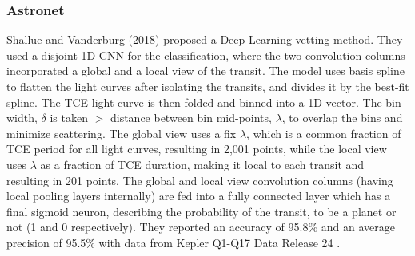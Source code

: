 \subsubsection{Astronet}
Shallue and Vanderburg (2018) \cite{astronet} proposed a Deep Learning vetting method. They used a disjoint 1D CNN for the classification, where the two convolution columns incorporated a global and a local view of the transit. The model uses basis spline to flatten the light curves after isolating the transits, and divides it by the best-fit spline. The TCE light curve is then folded and binned into a 1D vector. The bin width, $\delta$ is taken $>$ distance between bin mid-points, $\lambda$, to overlap the bins and minimize scattering. The global view uses a fix $\lambda$, which is a common fraction of TCE period for all light curves, resulting in 2,001 points, while the local view uses $\lambda$ as a fraction of TCE duration, making it local to each transit and resulting in 201 points. The global and local view convolution columns (having local pooling layers internally) are fed into a fully connected layer which has a final sigmoid neuron, describing the probability of the transit, to be a planet or not (1 and 0 respectively). They reported an accuracy of 95.8\% and an average precision of 95.5\% with data from Kepler Q1-Q17 Data Release 24 \cite{dr24}.


